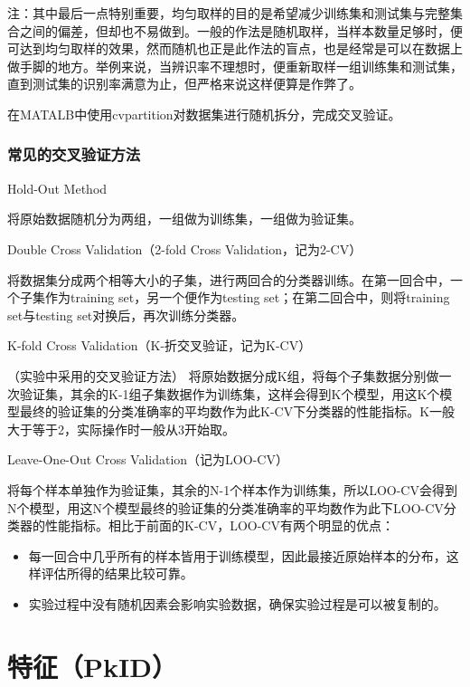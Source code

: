 \documentclass[12pt]{article}
\begin{document}
        {\color{blue}注：}其中最后一点特别重要，均匀取样的目的是希望减少训练集和测试集与完整集合之间的偏差，但却也不易做到。一般的作法是随机取样，当样本数量足够时，便可达到均匀取样的效果，然而随机也正是此作法的盲点，也是经常是可以在数据上做手脚的地方。举例来说，当辨识率不理想时，便重新取样一组训练集和测试集，直到测试集的识别率满意为止，但严格来说这样便算是作弊了。
        
        在MATALB中使用cvpartition对数据集进行随机拆分，完成交叉验证。
        
\subsubsection{常见的交叉验证方法}

\begin{itemize}
    \item Hold-Out Method
    
    将原始数据随机分为两组，一组做为训练集，一组做为验证集。
    \item Double Cross Validation（2-fold Cross Validation，记为2-CV）
    
    将数据集分成两个相等大小的子集，进行两回合的分类器训练。在第一回合中，一个子集作为training set，另一个便作为testing set；在第二回合中，则将training set与testing set对换后，再次训练分类器。
    {\color{blue}\item K-fold Cross Validation（K-折交叉验证，记为K-CV）}（实验中采用的交叉验证方法）
    \label{kCM}
    将原始数据分成K组，将每个子集数据分别做一次验证集，其余的K-1组子集数据作为训练集，这样会得到K个模型，用这K个模型最终的验证集的分类准确率的平均数作为此K-CV下分类器的性能指标。K一般大于等于2，实际操作时一般从3开始取。
    \item Leave-One-Out Cross Validation（记为LOO-CV）
    
    将每个样本单独作为验证集，其余的N-1个样本作为训练集，所以LOO-CV会得到N个模型，用这N个模型最终的验证集的分类准确率的平均数作为此下LOO-CV分类器的性能指标。相比于前面的K-CV，LOO-CV有两个明显的优点：
    \begin{itemize}
        \item 每一回合中几乎所有的样本皆用于训练模型，因此最接近原始样本的分布，这样评估所得的结果比较可靠。
        \item 实验过程中没有随机因素会影响实验数据，确保实验过程是可以被复制的。
    \end{itemize}
\end{itemize}


\section{特征（PkID）}
\end{document}
